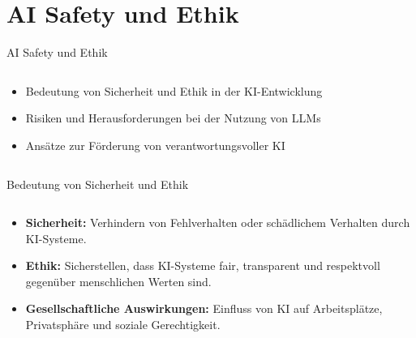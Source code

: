 \documentclass[aspectratio=1610, xcolor=dvipsnames, 9pt]{beamer}
\begin{document}
\section{AI Safety und Ethik}
\begin{frame}{AI Safety und Ethik}
  \begin{columns}
    \begin{column}{1\textwidth}
      \begin{itemize}
        \item Bedeutung von Sicherheit und Ethik in der KI-Entwicklung
        \item Risiken und Herausforderungen bei der Nutzung von LLMs
        \item Ansätze zur Förderung von verantwortungsvoller KI
      \end{itemize}
    \end{column}
  \end{columns}
\end{frame}

\begin{frame}{Bedeutung von Sicherheit und Ethik}
  \begin{columns}
    \begin{column}{1\textwidth}
      \begin{itemize}
        \item \textbf{Sicherheit:} Verhindern von Fehlverhalten oder schädlichem Verhalten durch KI-Systeme.
        \item \textbf{Ethik:} Sicherstellen, dass KI-Systeme fair, transparent und respektvoll gegenüber menschlichen Werten sind.
        \item \textbf{Gesellschaftliche Auswirkungen:} Einfluss von KI auf Arbeitsplätze, Privatsphäre und soziale Gerechtigkeit.
      \end{itemize}
    \end{column}
  \end{columns}
\end{frame}
\end{document}
